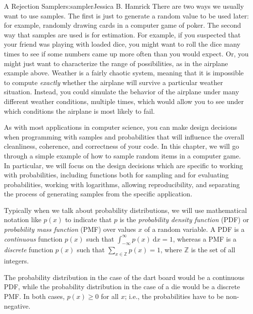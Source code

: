 \begin{aosachapter}{A Rejection Sampler}{s:sampler}{Jessica B. Hamrick}
There are two ways we usually want to use samples. The first is just to
generate a random value to be used later: for example, randomly drawing
cards in a computer game of poker. The second way that samples are used
is for estimation. For example, if you suspected that your friend was
playing with loaded dice, you might want to roll the dice many times to
see if some numbers came up more often than you would expect. Or, you
might just want to characterize the range of possibilities, as in the
airplane example above. Weather is a fairly chaotic system, meaning that
it is impossible to compute \emph{exactly} whether the airplane will
survive a particular weather situation. Instead, you could simulate the
behavior of the airplane under many different weather conditions,
multiple times, which would allow you to see under which conditions the
airplane is most likely to fail.

\label{programming-with-samples-and-probabilities}

As with most applications in computer science, you can make design
decisions when programming with samples and probabilities that will
influence the overall cleanliness, coherence, and correctness of your
code. In this chapter, we will go through a simple example of how to
sample random items in a computer game. In particular, we will focus on
the design decisions which are specific to working with probabilities,
including functions both for sampling and for evaluating probabilities,
working with logarithms, allowing reproducibility, and separating the
process of generating samples from the specific application.

\label{a-brief-aside-about-notation}

Typically when we talk about probability distributions, we will use
mathematical notation like $p(x)$ to indicate that $p$ is the
\emph{probability density function} (PDF) or \emph{probability mass
function} (PMF) over values $x$ of a random variable. A PDF is a
\emph{continuous} function $p(x)$ such that
$\int_{-\infty}^\infty p(x)\ \mathrm{d}x=1$, whereas a PMF is a
\emph{discrete} function $p(x)$ such that
$\sum_{x\in \mathbb{Z}} p(x)=1$, where $\mathbb{Z}$ is the set of all
integers.

The probability distribution in the case of the dart board would be a
continuous PDF, while the probability distribution in the case of a die
would be a discrete PMF. In both cases, $p(x) \geq 0$ for all $x$; i.e.,
the probabilities have to be non-negative.


\end{aosachapter}
